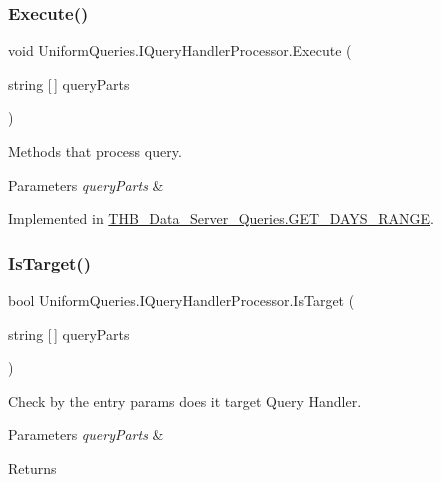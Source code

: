 \subsubsection{\texorpdfstring{Execute()}{Execute()}}
{\footnotesize\ttfamily void Uniform\+Queries.\+I\+Query\+Handler\+Processor.\+Execute (\begin{DoxyParamCaption}\item[{string \mbox{[}$\,$\mbox{]}}]{query\+Parts }\end{DoxyParamCaption})}



Methods that process query. 


\begin{DoxyParams}{Parameters}
{\em query\+Parts} & \\
\hline
\end{DoxyParams}


Implemented in \mbox{\hyperlink{class_t_h_b___data___server___queries_1_1_g_e_t___d_a_y_s___r_a_n_g_e_adb606b0ed5b0bceaa96ce14ba34158c9}{T\+H\+B\+\_\+\+Data\+\_\+\+Server\+\_\+\+Queries.\+G\+E\+T\+\_\+\+D\+A\+Y\+S\+\_\+\+R\+A\+N\+GE}}.

\mbox{\label{interface_uniform_queries_1_1_i_query_handler_processor_a435493887db64defdb6019c3c418a4d4}} 
\subsubsection{\texorpdfstring{Is\+Target()}{IsTarget()}}
{\footnotesize\ttfamily bool Uniform\+Queries.\+I\+Query\+Handler\+Processor.\+Is\+Target (\begin{DoxyParamCaption}\item[{string \mbox{[}$\,$\mbox{]}}]{query\+Parts }\end{DoxyParamCaption})}



Check by the entry params does it target Query Handler. 


\begin{DoxyParams}{Parameters}
{\em query\+Parts} & \\
\hline
\end{DoxyParams}
\begin{DoxyReturn}{Returns}

\end{DoxyReturn}


